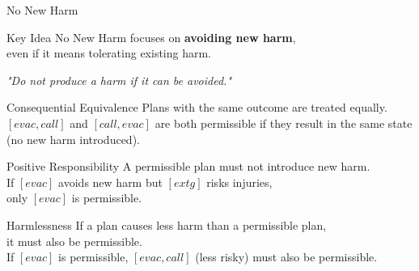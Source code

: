 \documentclass[compress,xcolor=table]{beamer}
\begin{document}
\begin{frame}{No New Harm}
    \begin{block}{Key Idea}
        No New Harm focuses on \textbf{avoiding new harm}, \\
        even if it means tolerating existing harm. \\
        \begin{center}
            \textit{"Do not produce a harm if it can be avoided."}
        \end{center}
    \end{block}
    \tiny
    \begin{block}{Consequential Equivalence}
        Plans with the same outcome are treated equally.\\
        $[evac, call]$ and $[call, evac]$ are both permissible if they result in the same state (no new harm introduced).
    \end{block}

    \begin{block}{Positive Responsibility}
        A permissible plan must not introduce new harm.\\
        If $[evac]$ avoids new harm but $[extg]$ risks injuries, \\
        only $[evac]$ is permissible.
    \end{block}

    \begin{block}{Harmlessness}
        If a plan causes less harm than a permissible plan, \\
        it must also be permissible.\\
        If $[evac]$ is permissible, $[evac, call]$ (less risky) must also be permissible.
    \end{block}
\end{frame}
\end{document}
